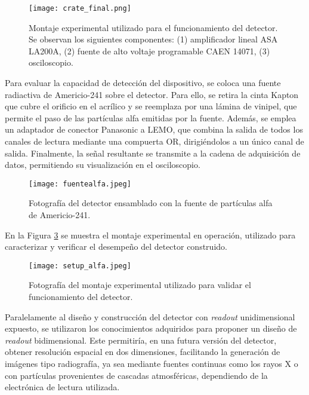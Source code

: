 \documentclass{report}
\begin{document}
\begin{figure}[H]
    \centering
    \texttt{[image: crate\_final.png]}
    \caption{Montaje experimental utilizado para el funcionamiento del detector. Se observan los siguientes componentes: (1) amplificador lineal ASA LA200A, (2) fuente de alto voltaje programable CAEN 14071, (3) osciloscopio.}
    \label{fig:crate_final}
\end{figure}

\noindent Para evaluar la capacidad de detección del dispositivo, se coloca una fuente radiactiva de Americio-241 sobre el detector. Para ello, se retira la cinta Kapton que cubre el orificio en el acrílico y se reemplaza por una lámina de vinipel, que permite el paso de las partículas alfa emitidas por la fuente. Además, se emplea un adaptador de conector Panasonic a LEMO, que combina la salida de todos los canales de lectura mediante una compuerta OR, dirigiéndolos a un único canal de salida. Finalmente, la señal resultante se transmite a la cadena de adquisición de datos, permitiendo su visualización en el osciloscopio.

\begin{figure}[H]
    \centering
    \texttt{[image: fuentealfa.jpeg]}
    \caption{Fotografía del detector ensamblado con la fuente de partículas alfa de Americio-241.}
    \label{fig:fuentealfa}
\end{figure}

\noindent En la Figura \ref{fig:setupalfa} se muestra el montaje experimental en operación, utilizado para caracterizar y verificar el desempeño del detector construido.

\begin{figure}[H]
    \centering
    \texttt{[image: setup\_alfa.jpeg]}
    \caption{Fotografía del montaje experimental utilizado para validar el funcionamiento del detector.}
    \label{fig:setupalfa}
\end{figure}



\noindent Paralelamente al diseño y construcción del detector con \textit{readout} unidimensional expuesto, se utilizaron los conocimientos adquiridos para proponer un diseño de \textit{readout} bidimensional. Este permitiría, en una futura versión del detector, obtener resolución espacial en dos dimensiones, facilitando la generación de imágenes tipo radiografía, ya sea mediante fuentes continuas como los rayos X o con partículas provenientes de cascadas atmosféricas, dependiendo de la electrónica de lectura utilizada.\\  
\end{document}
